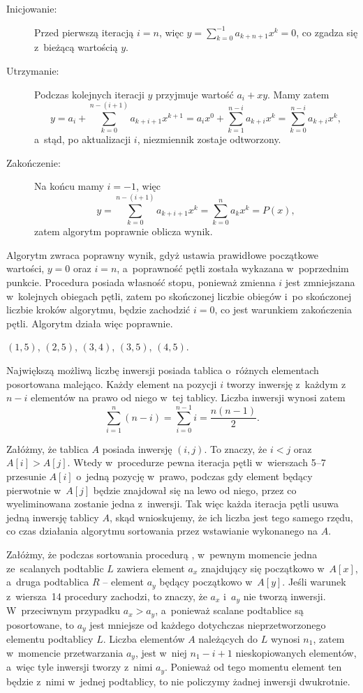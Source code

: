 \subproblem %
\begin{description}
	\item[Inicjowanie:] Przed pierwszą iteracją $i=n$, więc $y=\sum_{k=0}^{-1}a_{k+n+1}x^k=0$, co zgadza się z~bieżącą wartością $y$.
	\item[Utrzymanie:] Podczas kolejnych iteracji $y$ przyjmuje wartość $a_i+xy$. Mamy zatem
	\[
		y = a_i+\sum_{k=0}^{n-(i+1)}a_{k+i+1}x^{k+1} = a_ix^0+\sum_{k=1}^{n-i}a_{k+i}x^k = \sum_{k=0}^{n-i}a_{k+i}x^k,
	\]
	a~stąd, po aktualizacji $i$, niezmiennik zostaje odtworzony.
	\item[Zakończenie:] Na końcu mamy $i=-1$, więc
	\[
		y = \sum_{k=0}^{n-(i+1)}a_{k+i+1}x^k = \sum_{k=0}^na_kx^k = P(x),
	\]
	zatem algorytm poprawnie oblicza wynik.
\end{description}

\subproblem %
Algorytm zwraca poprawny wynik, gdyż ustawia prawidłowe początkowe wartości, $y=0$ oraz $i=n$, a~poprawność pętli  została wykazana w~poprzednim punkcie. Procedura posiada własność stopu, ponieważ zmienna $i$ jest zmniejszana w~kolejnych obiegach pętli, zatem po skończonej liczbie obiegów i~po skończonej liczbie kroków algorytmu, będzie zachodzić $i=0$, co jest warunkiem zakończenia pętli. Algorytm działa więc poprawnie.


\subproblem %
$(1,5)$, $(2,5)$, $(3,4)$, $(3,5)$, $(4,5)$.

\subproblem %
Największą możliwą liczbę inwersji posiada tablica o~różnych elementach posortowana malejąco. Każdy element na pozycji $i$ tworzy inwersję z~każdym z~$n-i$ elementów na prawo od niego w~tej tablicy. Liczba inwersji wynosi zatem
\[
	\sum_{i=1}^n(n-i) = \sum_{i=0}^{n-1}i = \frac{n(n-1)}{2}.
\]

\subproblem %
Załóżmy, że tablica $A$ posiada inwersję $(i,j)$. To znaczy, że $i<j$ oraz $A[i]>A[j]$. Wtedy w~procedurze  pewna iteracja pętli  w~wierszach 5\nobreakdash--7 przesunie $A[i]$ o~jedną pozycję w~prawo, podczas gdy element będący pierwotnie w~$A[j]$ będzie znajdował się na lewo od niego, przez co wyeliminowana zostanie jedna z~inwersji. Tak więc każda iteracja pętli  usuwa jedną inwersję tablicy $A$, skąd wnioskujemy, że ich liczba jest tego samego rzędu, co czas działania algorytmu sortowania przez wstawianie wykonanego na $A$.

\subproblem %
Załóżmy, że podczas sortowania procedurą , w~pewnym momencie jedna ze~scalanych podtablic $L$ zawiera element $a_x$ znajdujący się początkowo w~$A[x]$, a~druga podtablica $R$ -- element $a_y$ będący początkowo w~$A[y]$. Jeśli warunek z~wiersza~14 procedury  zachodzi, to znaczy, że $a_x$ i~$a_y$ nie tworzą inwersji. W~przeciwnym przypadku $a_x>a_y$, a~ponieważ scalane podtablice są posortowane, to $a_y$ jest mniejsze od każdego dotychczas nieprzetworzonego elementu podtablicy $L$. Liczba elementów $A$ należących do $L$ wynosi $n_1$, zatem w~momencie przetwarzania $a_y$, jest w~niej $n_1-i+1$ nieskopiowanych elementów, a~więc tyle inwersji tworzy z~nimi $a_y$. Ponieważ od tego momentu element ten będzie z~nimi w~jednej podtablicy, to nie policzymy żadnej inwersji dwukrotnie.

